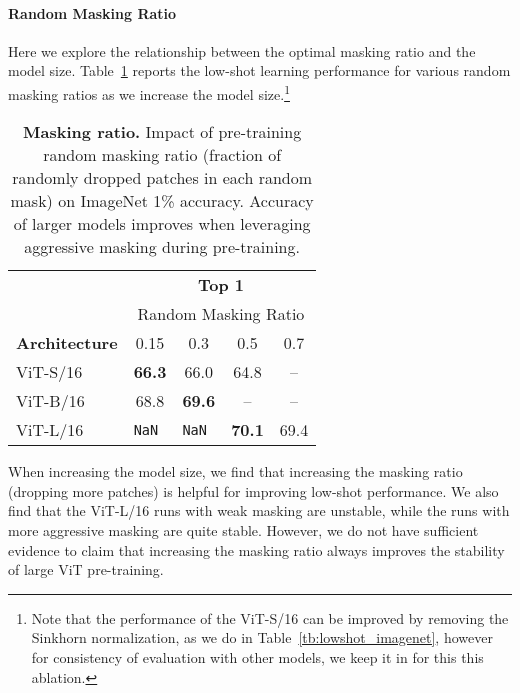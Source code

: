 \documentclass{article}
\begin{document}
\paragraph{Random Masking Ratio}
Here we explore the relationship between the optimal masking ratio and the model size.
Table~\ref{tb:masking_ratio} reports the low-shot learning performance for various random masking ratios as we increase the model size.\footnote{Note that the performance of the ViT-S/16 can be improved by removing the Sinkhorn normalization, as we do in Table~\ref{tb:lowshot_imagenet}, however for consistency of evaluation with other models, we keep it in for this this ablation.}
\begin{table}[h]
    \centering
    \caption{{\bf Masking ratio.} Impact of pre-training random masking ratio (fraction of randomly dropped patches in each random mask) on ImageNet 1\% accuracy. Accuracy of larger models improves when leveraging aggressive masking during pre-training.}
    \label{tb:masking_ratio}
    \begin{tabular}{l c c c c}
        & \multicolumn{4}{c}{\bf Top 1} \\[2mm]
        & \multicolumn{4}{c}{Random Masking Ratio} \\
        \bf\small Architecture & 0.15 & 0.3 & 0.5 & 0.7 \\ \toprule
        ViT-S/16 & \cellcolor{fbApp}\bf 66.3 & 66.0 & 64.8 & -- \\
        ViT-B/16 & 68.8 & \cellcolor{fbApp}\bf 69.6 & -- & -- \\
        ViT-L/16 & \tt NaN & \tt NaN & \cellcolor{fbApp}\bf 70.1 & 69.4 \\
        \bottomrule
    \end{tabular}
\end{table}

When increasing the model size, we find that increasing the masking ratio (dropping more patches) is helpful for improving low-shot performance.
We also find that the ViT-L/16 runs with weak masking are unstable, while the runs with more aggressive masking are quite stable. However, we do not have sufficient evidence to claim that increasing the masking ratio always improves the stability of large ViT pre-training.
\end{document}
